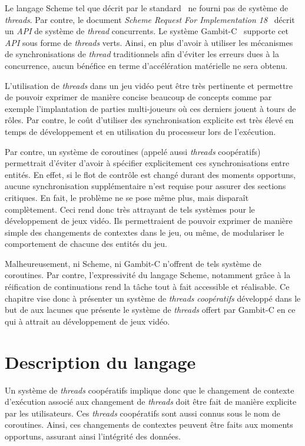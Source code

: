 \documentclass[12pt,oneside,letterpaper,francais]{book}
\begin{document}
Le langage Scheme tel que décrit par le standard~\cite{R5RS} ne fourni
pas de système de \textit{threads}. Par contre, le document
\textit{Scheme Request For Implementation 18}~\cite{SRFI18} décrit un
\textit{API} de système de \textit{thread} concurrents. Le système
Gambit-C~\cite{Gambit4} supporte cet \textit{API} sous forme de
\textit{threads} verts. Ainsi, en plus d'avoir à utiliser les
mécanismes de synchronisations de \textit{thread} traditionnels afin
d'éviter les erreurs dues à la concurrence, aucun bénéfice en terme
d'accélération matérielle ne sera obtenu.

L'utilisation de \textit{threads} dans un jeu vidéo peut être très
pertinente et permettre de pouvoir exprimer de manière concise
beaucoup de concepts comme par exemple l'implantation de parties
multi-joueurs où ces derniers jouent à tours de rôles. Par contre, le
coût d'utiliser des synchronisation explicite est très élevé en temps
de développement et en utilisation du processeur lors de l'exécution. 

Par contre, un système de coroutines (appelé aussi \textit{threads}
coopératifs) permettrait d'éviter d'avoir à spécifier explicitement
ces synchronisations entre entités. En effet, si le flot de contrôle
est changé durant des moments opportuns, aucune synchronisation
supplémentaire n'est requise pour assurer des sections critiques. En
fait, le problème ne se pose même plus, mais disparaît
complètement. Ceci rend donc très attrayant de tels systèmes pour le
développement de jeux vidéo. Ils permettraient de pouvoir exprimer de
manière simple des changements de contextes dans le jeu, ou même, de
modulariser le comportement de chacune des entités du jeu.

Malheureusement, ni Scheme, ni Gambit-C n'offrent de tels système de
coroutines. Par contre, l'expressivité du langage Scheme, notamment
grâce à la réification de continuations rend la tâche tout à fait
accessible et réalisable. Ce chapitre vise donc à présenter un système
de \textit{threads} \emph{coopératifs} développé dans le but de aux
lacunes que présente le système de \textit{threads} offert par
Gambit-C en ce qui à attrait au développement de jeux vidéo.


\section{Description du langage}

Un système de \textit{threads} coopératifs implique donc que le
changement de contexte d'exécution associé aux changement de
\textit{threads} doit être fait de manière explicite par les
utilisateurs. Ces \textit{threads} coopératifs sont aussi connus sous
le nom de coroutines. Ainsi, ces changements de contextes peuvent être
faits aux moments opportuns, assurant ainsi l'intégrité des données.
\end{document}
